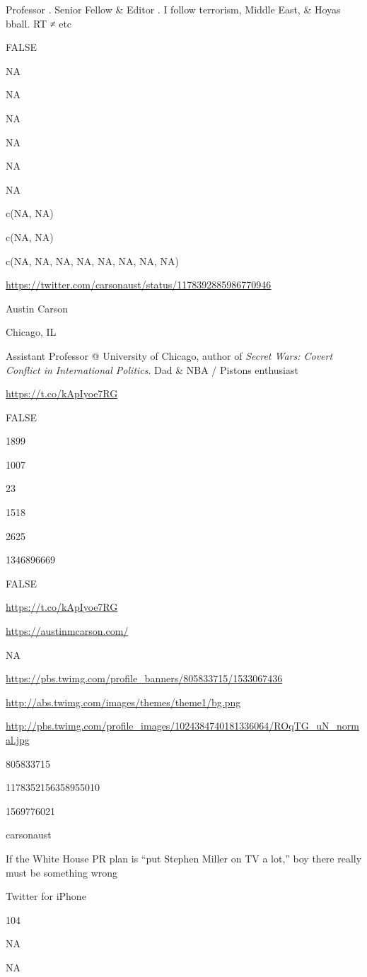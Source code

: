 \documentclass[]{book}
\begin{document}
Professor \citet{GeorgetownSFS}. Senior Fellow \citet{BrookingsFP} \&
Editor \citet{lawfareblog}. I follow terrorism, Middle East, \& Hoyas
bball. RT ≠ etc

FALSE

NA

NA

NA

NA

NA

NA

c(NA, NA)

c(NA, NA)

c(NA, NA, NA, NA, NA, NA, NA, NA)

\url{https://twitter.com/carsonaust/status/1178392885986770946}

Austin Carson

Chicago, IL

Assistant Professor @ University of Chicago, author of \emph{Secret
Wars: Covert Conflict in International Politics}. Dad \& NBA / Pistons
enthusiast

\url{https://t.co/kApIyoe7RG}

FALSE

1899

1007

23

1518

2625

1346896669

FALSE

\url{https://t.co/kApIyoe7RG}

\url{https://austinmcarson.com/}

NA

\url{https://pbs.twimg.com/profile_banners/805833715/1533067436}

\url{http://abs.twimg.com/images/themes/theme1/bg.png}

\url{http://pbs.twimg.com/profile_images/1024384740181336064/ROqTG_uN_normal.jpg}

805833715

1178352156358955010

1569776021

carsonaust

If the White House PR plan is ``put Stephen Miller on TV a lot,'' boy
there really must be something wrong

Twitter for iPhone

104

NA

NA
\end{document}
